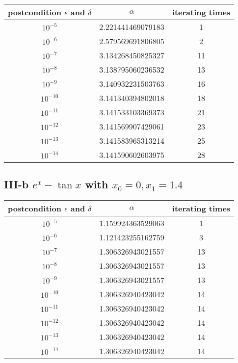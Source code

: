 \documentclass[twoside,a4paper]{article}
\begin{document}
\begin{tabular}{|c|c|c|}
\hline
postcondition   $\epsilon$  and  $\delta$  & $\alpha$  & iterating times\\
\hline
$10^{-5}$ & 2.221441469079183 & 1\\
\hline
$10^{-6}$ & 2.579569691806805 & 2\\
\hline
$10^{-7}$ & 3.134268450825327 & 11\\
\hline
$10^{-8}$ & 3.138795060236532 & 13\\
\hline
$10^{-9}$ & 3.140932231503763 & 16\\
\hline
$10^{-10}$ & 3.141340394802018 & 18\\
\hline
$10^{-11}$ & 3.141533103369373 & 21\\
\hline
$10^{-12}$ & 3.141569907429061 & 23\\
\hline
$10^{-13}$ & 3.141583965313214 & 25\\
\hline
$10^{-14}$ & 3.141590602603975 & 28\\
\hline
\end{tabular}

\subsection*{III-b \small{$e^{x}-\tan x$ with $x_0=0,x_1=1.4$}}

\begin{tabular}{|c|c|c|}
\hline
postcondition   $\epsilon$  and  $\delta$  & $\alpha$  & iterating times\\
\hline
$10^{-5}$ & 1.159924363529063 & 1\\
\hline
$10^{-6}$ & 1.121423255162759 & 3\\
\hline
$10^{-7}$ & 1.306326943021557 & 13\\
\hline
$10^{-8}$ & 1.306326943021557 & 13\\
\hline
$10^{-9}$ & 1.306326943021557 & 13\\
\hline
$10^{-10}$ & 1.306326940423042 & 14\\
\hline
$10^{-11}$ & 1.306326940423042 & 14\\
\hline
$10^{-12}$ & 1.306326940423042 & 14\\
\hline
$10^{-13}$ & 1.306326940423042 & 14\\
\hline
$10^{-14}$ & 1.306326940423042 & 14\\
\hline
\end{tabular}
\end{document}
